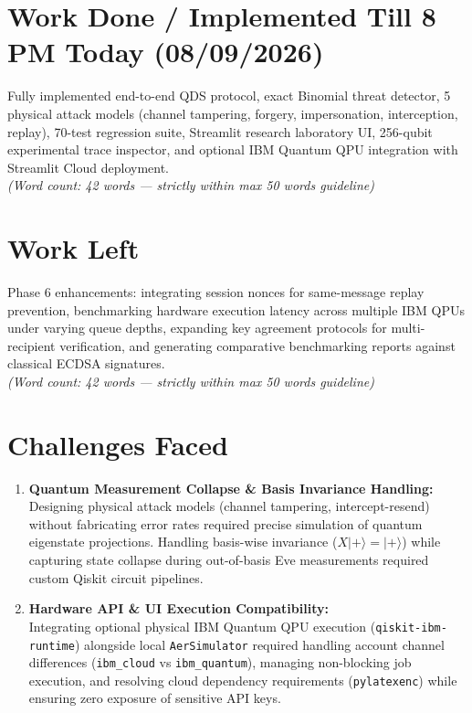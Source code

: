 \documentclass[11pt,a4paper]{article}
\begin{document}
\section{Work Done / Implemented Till 8 PM Today (08/09/2026)}
Fully implemented end-to-end QDS protocol, exact Binomial threat detector, 5 physical attack models (channel tampering, forgery, impersonation, interception, replay), 70-test regression suite, Streamlit research laboratory UI, 256-qubit experimental trace inspector, and optional IBM Quantum QPU integration with Streamlit Cloud deployment. \\
\textit{(Word count: 42 words --- strictly within max 50 words guideline)}

\section{Work Left}
Phase 6 enhancements: integrating session nonces for same-message replay prevention, benchmarking hardware execution latency across multiple IBM QPUs under varying queue depths, expanding key agreement protocols for multi-recipient verification, and generating comparative benchmarking reports against classical ECDSA signatures. \\
\textit{(Word count: 42 words --- strictly within max 50 words guideline)}

\section{Challenges Faced}
\begin{enumerate}[leftmargin=*,label=\textbf{\arabic*.}]
    \item \textbf{Quantum Measurement Collapse \& Basis Invariance Handling:} \\
    Designing physical attack models (channel tampering, intercept-resend) without fabricating error rates required precise simulation of quantum eigenstate projections. Handling basis-wise invariance ($X|+\rangle = |+\rangle$) while capturing state collapse during out-of-basis Eve measurements required custom Qiskit circuit pipelines.

    \item \textbf{Hardware API \& UI Execution Compatibility:} \\
    Integrating optional physical IBM Quantum QPU execution (\texttt{qiskit-ibm-runtime}) alongside local \texttt{AerSimulator} required handling account channel differences (\texttt{ibm\_cloud} vs \texttt{ibm\_quantum}), managing non-blocking job execution, and resolving cloud dependency requirements (\texttt{pylatexenc}) while ensuring zero exposure of sensitive API keys.
\end{enumerate}
\end{document}
